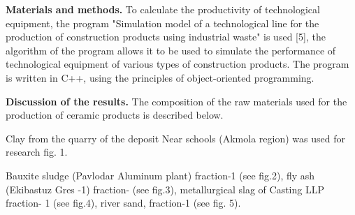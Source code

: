 \begin{multicols}{2}
{\bfseries Materials and methods.} To calculate the productivity of
technological equipment, the program "Simulation model of a
technological line for the production of construction products using
industrial waste" is used {[}5{]}, the algorithm of the program allows
it to be used to simulate the performance of technological equipment of
various types of construction products. The program is written in C++,
using the principles of object-oriented programming.

{\bfseries Discussion of the results.} The composition of the raw materials
used for the production of ceramic products is described below.

Clay from the quarry of the deposit Near schools (Akmola region) was
used for research fig. 1.

Bauxite sludge (Pavlodar Aluminum plant) fraction-1 (see fig.2), fly ash
(Ekibastuz Gres -1) fraction- (see fig.3), metallurgical slag of Casting
LLP fraction- 1 (see fig.4), river sand, fraction-1 (see fig. 5).
\end{multicols}

